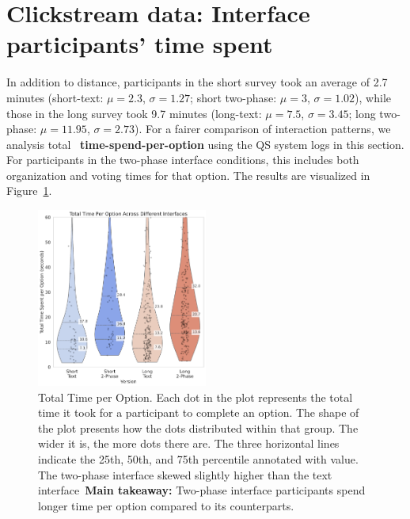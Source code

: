 \section{Clickstream data: Interface participants' time spent}
In addition to distance, participants in the short survey took an average of 2.7 minutes (short-text: $\mu=2.3$, $\sigma=1.27$; short two-phase: $\mu=3$, $\sigma=1.02$), while those in the long survey took 9.7 minutes (long-text: $\mu=7.5$, $\sigma=3.45$; long two-phase: $\mu=11.95$, $\sigma=2.73$). For a fairer comparison of interaction patterns, we analysis total ~\textbf{time-spend-per-option} using the QS system logs in this section. For participants in the two-phase interface conditions, this includes both organization and voting times for that option. The results are visualized in Figure~\ref{fig:total_time}.

\begin{figure}[h]
    \centering
    \includegraphics[width=0.5\textwidth, trim=0 0 0 0, clip]{content/image/time/Total Time Per Option Across Different Interfaces.pdf}
    \captionsetup{width=1\textwidth, justification=justified}
    \caption{Total Time per Option. Each dot in the plot represents the total time it took for a participant to complete an option. The shape of the plot presents how the dots distributed within that group. The wider it is, the more dots there are. The three horizontal lines indicate the 25th, 50th, and 75th percentile annotated with value. The two-phase interface skewed slightly higher than the text interface~\textbf{Main takeaway: } Two-phase interface participants spend longer time per option compared to its counterparts.}
    \label{fig:total_time}
\end{figure}

